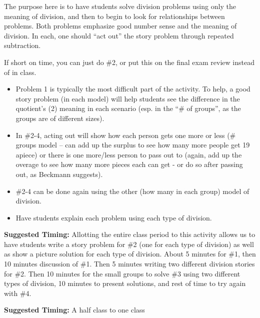 \documentclass{ximera}
\begin{document}
\begin{instructorNotes}
The purpose here is to have students solve division problems using only the meaning of division, and then to begin to look for relationships between problems. Both problems emphasize good number sense and the meaning of division.  In each, one should ``act out'' the story problem through repeated subtraction.

If short on time, you can just do \#2, or put this on the final exam review instead of in class.

\begin{itemize}
    \item Problem 1 is typically the most difficult part of the activity.  To help, a good story problem (in each model) will help students see the difference in the quotient's (2) meaning in each scenario (esp. in the ``\# of groups'', as the groups are of different sizes). \item In \#2-4, acting out will show how each person gets one more or less (\# groups model -- can add up the surplus to see how many more people get 19 apiece) or there is one more/less person to pass out to (again, add up the overage to see how many more pieces each can get - or do so after passing out, as Beckmann suggests).  
	\item \#2-4 can be done again using the other (how many in each group) model of division.
	\item Have students explain each problem using each type of division.  
\end{itemize}

{\bf Suggested Timing:} Allotting the entire class period to this activity allows us to have students write a story problem for \#2 (one for each type of division) as well as show a picture solution for each type of division.  About 5 minutes for \#1, then 10 minutes discussion of \#1.  Then 5 minutes writing two different division stories for \#2.  Then 10 minutes for the small groups to solve \#3 using two different types of division, 10 minutes to present solutions, and rest of time to try again with \#4. 



{\bf Suggested Timing:}  A half class to one class

\end{instructorNotes}
\end{document}
